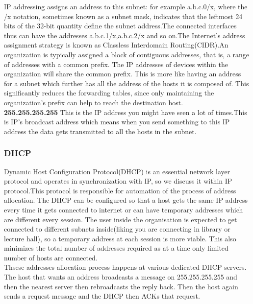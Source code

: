 \documentclass{article}
\begin{document}
IP addressing assigns an address to this subnet: for example a.b.c.0/x, where the /x notation, sometimes known as a subnet mask, indicates that the leftmost 24 bits of the 32-bit quantity define the subnet address.The connected interfaces thus can have the addresses a.b.c.1/x,a.b.c.2/x and so on.The Internet’s address assignment strategy is known as Classless Interdomain Routing(CIDR).An organization is typically assigned a block of contiguous addresses, that is, a range of addresses with a common prefix. The IP addresses of devices within the organization will share the common prefix. This is more like having an address for a subnet which further has all the address of the hosts it is composed of. This significantly reduces the forwarding tables, since only maintaining the organization's prefix can help to reach the destination host. \\
\textbf{255.255.255.255} This is the IP address you might have seen a lot of times.This is IP's broadcast address which means when you send something to this IP address the data gets transmitted to all the hosts in the subnet.
\subsubsection{DHCP}
Dynamic Host Configuration Protocol(DHCP) is an essential network layer protocol and operates in synchronization with IP, so we discuss it within IP protocol.This protocol is responsible for automation of the process of address allocation. The DHCP can be configured so that a host gets the same IP address every time it gets connected to internet or can have temporary addresses which are different every session. The user inside the organisation is expected to get connected to different subnets inside(liking you are connecting in library or lecture hall), so a temporary address at each session is more viable. This also minimizes the total number of addresses required as at a time only limited number of hosts are connected. \\Thsese addresses allocation process happens at various dedicated DHCP servers. The host that wants an address broadcasts a message on 255.255.255.255 and then the nearest server then rebroadcasts the reply back. Then the host again sends a request message and the DHCP then ACKs that request.
\end{document}

